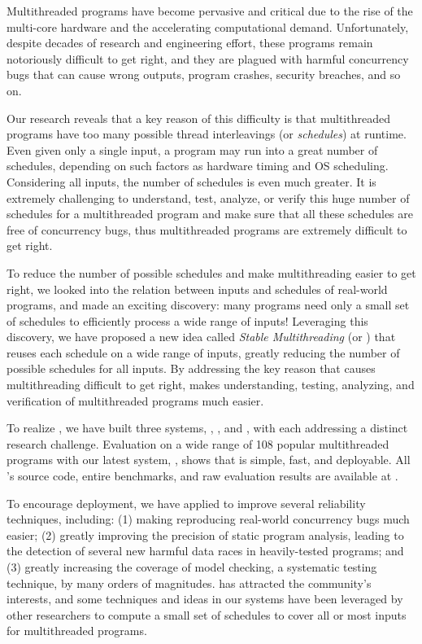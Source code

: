 Multithreaded programs have become pervasive and critical due to the rise of the
multi-core hardware and the accelerating computational demand.
Unfortunately, despite decades of research and engineering effort, these
programs remain notoriously difficult to get right, and they are plagued with
harmful concurrency bugs that can cause wrong outputs, program crashes, security
breaches, and so on.

Our research reveals that a key reason of this difficulty is
that multithreaded programs have too many possible thread interleavings (or
\emph{schedules}) at runtime. Even given only a single input, a program may run 
into a great number of schedules, depending on such factors as hardware timing 
and OS scheduling. Considering all inputs, the number of schedules is even much 
greater. It is extremely challenging to understand, test, analyze, or verify 
this huge number of schedules for a multithreaded program and make sure that 
all these schedules are free of concurrency bugs, thus multithreaded programs 
are extremely difficult to get right.

To reduce the number of possible schedules and make multithreading
easier to get right, we looked into the relation between inputs and schedules 
of real-world programs, and made an exciting discovery: many programs need only 
a small set of schedules to efficiently process a wide range of inputs! 
Leveraging this discovery, we have proposed a new idea called \emph{Stable 
Multithreading} (or \emph{\smt}) that reuses each schedule on a wide range of 
inputs, greatly reducing the number of possible schedules for all inputs. By 
addressing the key reason that causes multithreading difficult to get right, 
\smt makes understanding, testing, analyzing, and verification of 
multithreaded programs much easier.

To realize \smt, we have built three \smt systems, \tern, \peregrine, and 
\parrot, with each addressing a distinct research challenge. Evaluation on a 
wide range of 108 popular multithreaded programs with our latest \smt system, 
\parrot, shows that \smt is simple, fast, and deployable. All \parrot's source 
code, entire benchmarks, and raw evaluation results are available at \github.

To encourage deployment, we have applied \smt to improve several reliability 
techniques, including: (1) making reproducing real-world concurrency bugs much 
easier;  (2) greatly improving the precision of static program analysis, 
leading to the detection of several new harmful data races in heavily-tested 
programs; and (3) greatly increasing the coverage of model checking, a 
systematic testing technique, by many orders of magnitudes. \smt has attracted 
the community's interests, and some techniques and ideas in our \smt systems 
have been leveraged by other researchers to compute a small set of schedules to 
cover all or most inputs for multithreaded programs.

% 
